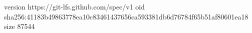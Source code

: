version https://git-lfs.github.com/spec/v1
oid sha256:41183b49863778ea10c83461437656ca593381db6d76784f65b51af80601ea18
size 87544
